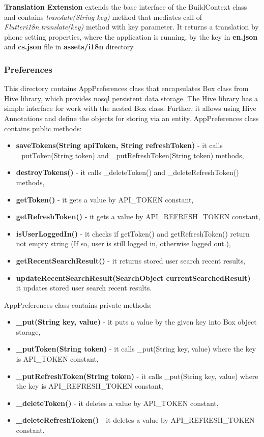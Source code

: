 \textbf{Translation Extension} extends the base interface of the BuildContext class and contains \textit{translate(String key)} method that mediates call of \textit{Flutteri18n.translate(key)} method with key parameter.
It returns a translation by phone setting properties, where the application is running, by the key in  \textbf{en.json} and \textbf{cs.json} file in \textbf{assets/i18n} directory.


\subsubsection{Preferences}\label{subsubsec:preferences}
This directory contains AppPreferences class that encapsulates Box class from Hive library, which provides \acrshort{nosql} persistent data storage.
The Hive library has a simple interface for work with the nested Box class.
Further, it allows using Hive Annotations and define the objects for storing via an entity.
AppPreferences class contains public methods:
\begin{itemize}
    \item \textbf{saveTokens(String apiToken, String refreshToken)} - it calls \_putToken(String token) and \_putRefreshToken(String token) methods,
    \item \textbf{destroyTokens()} - it calls \_deleteToken() and \_deleteRefreshToken() methods,
    \item \textbf{getToken()} - it gets a value by API\_TOKEN constant,
    \item \textbf{getRefreshToken()} - it gets a value by API\_REFRESH\_TOKEN constant,
    \item \textbf{isUserLoggedIn()} - it checks if getToken() and getRefreshToken() return not empty string (If so, user is still logged in, otherwise logged out.),
    \item \textbf{getRecentSearchResult()} - it returns stored user search recent results,
    \item \textbf{updateRecentSearchResult(SearchObject currentSearchedResult)} - it updates stored user search recent results.
\end{itemize}
AppPreferences class contains private methods:
\begin{itemize}
    \item \textbf{\_put(String key, value)} - it puts a value by the given key into Box object storage,
    \item \textbf{\_putToken(String token)} - it calls \_put(String key, value) where the key is API\_TOKEN constant,
    \item \textbf{\_putRefreshToken(String token)} - it calls \_put(String key, value) where the key is API\_REFRESH\_TOKEN constant,
    \item \textbf{\_deleteToken()} - it deletes a value by API\_TOKEN constant,
    \item \textbf{\_deleteRefreshToken()} - it deletes a value by API\_REFRESH\_TOKEN constant.
\end{itemize}

